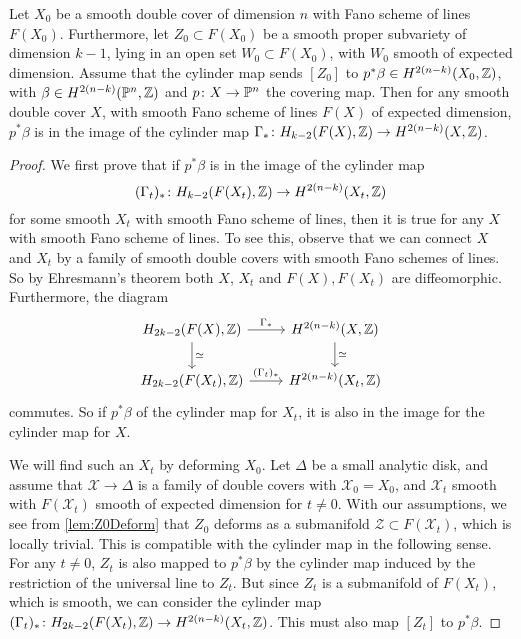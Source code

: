\begin{lemma}
    \label{prop:SpecializationDoubleCover}
  Let $X_0$ be a smooth double cover of dimension $n$ with Fano scheme of lines $F(X_0)$. Furthermore, let $Z_0 \subset F(X_0)$ be a smooth proper subvariety of dimension $k-1$, lying in an open set $W_0 \subset F(X_0)$, with $W_0$ smooth of expected dimension. Assume that the cylinder map sends $[Z_0]$ to $p^*\beta \in H^{2(n-k)}(X_0,\mathbb{Z})$, with $\beta \in H^{2(n-k)}(\mathbb{P}^n,\mathbb{Z})$ and $p \colon X \to \mathbb{P}^n$ the covering map. Then for any smooth double cover $X$, with smooth Fano scheme of lines $F(X)$ of expected dimension, $p^*\beta$ is in the image of the cylinder map $\Gamma_* \colon H_{k-2}(F(X),\mathbb{Z}) \to H^{2(n-k)}(X,\mathbb{Z})$.
\end{lemma}

\begin{proof}
  We first prove that if $p^*\beta$ is in the image of the cylinder map 
\[(\Gamma_t)_* \colon H_{k-2}(F(X_t),\mathbb{Z}) \to H^{2(n-k)}(X_t,\mathbb{Z})\]
 for some smooth $X_t$ with smooth Fano scheme of lines, then it is true for any $X$ with smooth Fano scheme of lines. To see this, observe that we can connect $X$ and $X_t$ by a family of smooth double covers with smooth Fano schemes of lines. So by Ehresmann's theorem both $X$, $X_t$ and $F(X), F(X_t)$ are diffeomorphic. Furthermore, the diagram
\begin{equation*}
  \begin{tikzcd}
    H_{2k-2}(F(X),\Z) \arrow["\Gamma_*"]{r} \arrow["\simeq"]{d}& H^{2(n-k)}(X,\Z) \arrow["\simeq"]{d}\\
    H_{2k-2}(F(X_t),\Z) \arrow["(\Gamma_t)_*"]{r}& H^{2(n-k)}(X_t,\Z)
  \end{tikzcd}
\end{equation*}
commutes. So if $p^*\beta$ of the cylinder map for $X_t$, it is also in the image for the cylinder map for $X$.

We will find such an $X_t$ by deforming $X_0$. Let $\Delta$ be a small analytic disk, and assume that $\mathscr{X} \to \Delta$ is a family of double covers with $\mathscr{X}_0 = X_0$, and $\mathscr{X}_t$ smooth with $F(\mathscr{X}_t)$ smooth of expected dimension for $t \neq 0$. With our assumptions, we see from \cref{lem:Z0Deform} that $Z_0$ deforms as a submanifold $\mathscr{Z} \subset F(\mathscr{X}_t)$, which is locally trivial. This is compatible with the cylinder map in the following sense. For any $t \neq 0$, $Z_t$ is also mapped to $p^*\beta$ by the cylinder map induced by the restriction of the universal line to $Z_t$. But since $Z_t$ is a submanifold of $F(X_t)$, which is smooth, we can consider the cylinder map $(\Gamma_t)_* \colon  H_{2k-2}(F(X_t),\mathbb{Z}) \to H^{2(n-k)}(X_t,\mathbb{Z})$. This must also map $[Z_t]$ to $p^*\beta$.
\end{proof}


